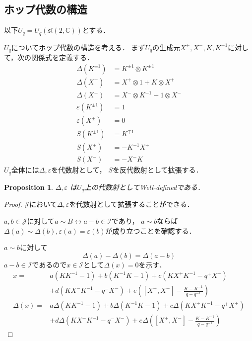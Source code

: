 \documentclass[10pt,dvipdfm]{beamer}
\newtheorem{proposition}{Proposition}
\newcommand{\CC}{\mathbb{C}}
\begin{document}
  \subsection{ホップ代数の構造}
  \begin{frame}
    以下$U_q = U_q(\mathfrak{sl}(2,\CC))$とする．

    $U_q$についてホップ代数の構造を考える．
    まず$U_q$の生成元$X^+,X^-,K,K^{-1}$に対して，次の関係式を定義する．
    \begin{align*}
      \Delta(K^{\pm1}) &= K^{\pm1}\otimes K^{\pm1}\\
      \Delta(X^+) &= X^+\otimes 1 + K\otimes X^+\\
      \Delta(X^-) &= X^-\otimes K^{-1} + 1\otimes X^-\\
      \varepsilon(K^{\pm1}) &= 1\\
      \varepsilon(X^{\pm}) &= 0\\
      S(K^{\pm1}) &= K^{\mp1}\\
      S(X^+) &= -K^{-1}X^+\\
      S(X^-) &= -X^-K
    \end{align*}
    $U_q$全体には$\Delta,\varepsilon$を代数射として，
    $S$を反代数射として拡張する．
  \end{frame}
  \begin{frame}
    \begin{proposition}
      $\Delta,\varepsilon$ は$U_q$上の代数射としてWell-definedである．
    \end{proposition}
    \begin{proof}
      $\mathscr{J}$において$\Delta,\varepsilon$を代数射として拡張することができる．

      $a,b\in\mathscr{J}$に対して$a\sim B\leftrightarrow a-b\in\mathscr{I}$であり，
      $a\sim b$ならば$\Delta(a)\sim\Delta(b),\varepsilon(a)=\varepsilon(b)$が成り立つことを確認する．
      
      $a\sim b$に対して
      \[
      \Delta(a)-\Delta(b) = \Delta(a-b)
      \]
      $a-b\in \mathscr{I}$であるので$x \in \mathscr{I}$として$\Delta(x)=0$を示す．
      \begin{align*}
        x =& a(KK^{-1}-1)+b(K^{-1}K-1)+c(KX^+K^{-1}-q^+X^+)\\
        &+d(KX^-K^{-1}-q^-X^-)+e\left([X^+,X^-]-\frac{K-K^{-1}}{q-q^{-1}}\right)\\
        \Delta(x) =& a\Delta(KK^{-1}-1)+b\Delta(K^{-1}K-1)+c\Delta(KX^+K^{-1}-q^+X^+)\\
        &+d\Delta(KX^-K^{-1}-q^-X^-)+e\Delta\left([X^+,X^-]-\frac{K-K^{-1}}{q-q^{-1}}\right)
      \end{align*}
      \let\qedsymbol\relax
    \end{proof}
  \end{frame}
\end{document}
